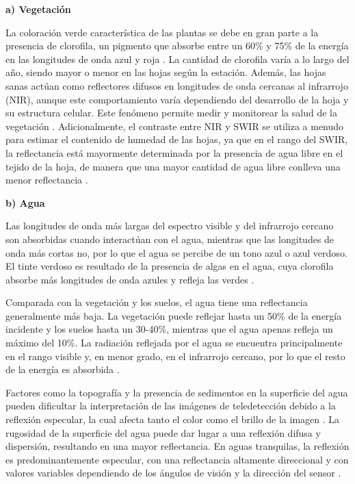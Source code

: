 \textbf{a) Vegetación}

La coloración verde característica de las plantas se debe en gran parte a la presencia de clorofila, un pigmento que absorbe entre un 60\% y 75\% de la energía en las longitudes de onda azul y roja \cite{chuvieco2016fundamentals}. La cantidad de clorofila varía a lo largo del año, siendo mayor o menor en las hojas según la estación. Además, las hojas sanas actúan como reflectores difusos en longitudes de onda cercanas al infrarrojo (NIR), aunque este comportamiento varía dependiendo del desarrollo de la hoja y su estructura celular. Este fenómeno permite medir y monitorear la salud de la vegetación \cite{canada2007fundamentals}. Adicionalmente, el contraste entre NIR y SWIR se utiliza a menudo para estimar el contenido de humedad de las hojas, ya que en el rango del SWIR, la reflectancia está mayormente determinada por la presencia de agua libre en el tejido de la hoja, de manera que una mayor cantidad de agua libre conlleva una menor reflectancia \cite{tempfli2009principles}.

\textbf{b) Agua}

Las longitudes de onda más largas del espectro visible y del infrarrojo cercano son absorbidas cuando interactúan con el agua, mientras que las longitudes de onda más cortas no, por lo que el agua se percibe de un tono azul o azul verdoso. El tinte verdoso es resultado de la presencia de algas en el agua, cuya clorofila absorbe más longitudes de onda azules y refleja las verdes \cite{canada2007fundamentals, tempfli2009principles}.

Comparada con la vegetación y los suelos, el agua tiene una reflectancia generalmente más baja. La vegetación puede reflejar hasta un 50\% de la energía incidente y los suelos hasta un 30-40\%, mientras que el agua apenas refleja un máximo del 10\%. La radiación reflejada por el agua se encuentra principalmente en el rango visible y, en menor grado, en el infrarrojo cercano, por lo que el resto de la energía es absorbida \cite{tempfli2009principles}.

Factores como la topografía y la presencia de sedimentos en la superficie del agua pueden dificultar la interpretación de las imágenes de teledetección debido a la reflexión especular, la cual afecta tanto el color como el brillo de la imagen \cite{canada2007fundamentals}. La rugosidad de la superficie del agua puede dar lugar a una reflexión difusa y dispersión, resultando en una mayor reflectancia. En aguas tranquilas, la reflexión es predominantemente especular, con una reflectancia altamente direccional y con valores variables dependiendo de los ángulos de visión y la dirección del sensor \cite{chuvieco2016fundamentals}.

